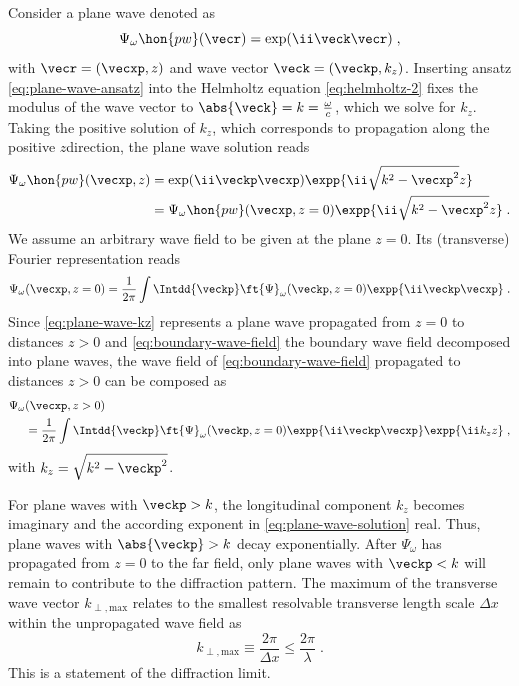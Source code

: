 \documentclass[
twoside,
openright,
titlepage,
numbers=noenddot,
headinclude,
fleqn,
a4paper,
footinclude=true,
cleardoublepage=empty,
abstractoff,
BCOR=5mm,
paper=a4,
fontsize=11pt,
british,ngerman,american,
]{scrreprt}
\begin{document}
Consider a plane wave denoted as
\begin{equation}
  \label{eq:plane-wave-ansatz}
  \Psi_\omega\hon{p w}(\vecr)=\exp(\ii \veck\vecr) \;,
\end{equation}
with $\vecr=(\vecxp,z)$ and wave vector $\veck=(\veckp,k_z)$.
Inserting ansatz \cref{eq:plane-wave-ansatz} into the Helmholtz
equation \eqref{eq:helmholtz-2} fixes the modulus of the wave vector
to $\abs{\veck}=k=\frac{\omega}{c}$, which we solve for $k_z$.  Taking
the positive solution of $k_z$, which corresponds to propagation along
the positive $z$\hyph direction, the plane wave solution reads
\begin{equation}
  \label{eq:plane-wave-kz}
  \begin{split}
    \Psi_\omega\hon{p w}(\vecxp,z) 
    & = \exp(\ii\veckp\vecxp)\expp{\ii\sqrt{k^2-\vecxp^2}z}
    \\ & = \Psi_\omega\hon{p w}(\vecxp,z=0) \expp{\ii\sqrt{k^2-\vecxp^2}z} \;.
  \end{split}
\end{equation}
We assume an arbitrary wave field to be given at the plane $z=0$.  Its
(transverse) Fourier representation reads
\begin{equation}
  \label{eq:boundary-wave-field}
  \Psi_\omega(\vecxp,z=0) 
  = \frac{1}{2\pi}\int\Intdd{\veckp}\ft{\Psi}_\omega(\veckp,z=0)
  \expp{\ii\veckp\vecxp} \;.
\end{equation}
Since \cref{eq:plane-wave-kz} represents a plane wave propagated from
$z=0$ to distances $z>0$ and \cref{eq:boundary-wave-field} the
boundary wave field decomposed into plane waves, the wave field of
\cref{eq:boundary-wave-field} propagated to distances $z>0$ can be
composed as
\begin{equation}
  \label{eq:plane-wave-solution}
  \begin{split}
      \Psi_\omega&(\vecxp,z>0) 
 \\ & =  \frac{1}{2\pi} \int\Intdd{\veckp}
  \ft{\Psi}_\omega(\veckp,z=0)\expp{\ii\veckp\vecxp}\expp{\ii k_z z} \;,
  \end{split}
\end{equation}
with $k_z =\sqrt{k^2-\veckp^2}$. 

For plane waves with $\veckp>k$, the longitudinal component $k_z$
becomes imaginary and the according exponent in
\cref{eq:plane-wave-solution} real.  Thus, plane waves with
$\abs{\veckp}>k$ decay exponentially.  After $\Psi_\omega$ has
propagated from $z=0$ to the far field, only plane waves with
$\veckp<k$ will remain to contribute to the diffraction pattern.  The
maximum of the transverse wave vector $k_{\perp,\mathrm{max}}$ relates
to the smallest resolvable transverse length scale $\Delta x$ within
the unpropagated wave field as
\begin{equation}
  \label{eq:diffraction-limit}
  k_{\perp,\mathrm{max}}\equiv\frac{2\pi}{\Delta x} 
  \le\frac{2\pi}{\lambda} \;.
\end{equation}
This is a statement of the diffraction limit.
\end{document}
